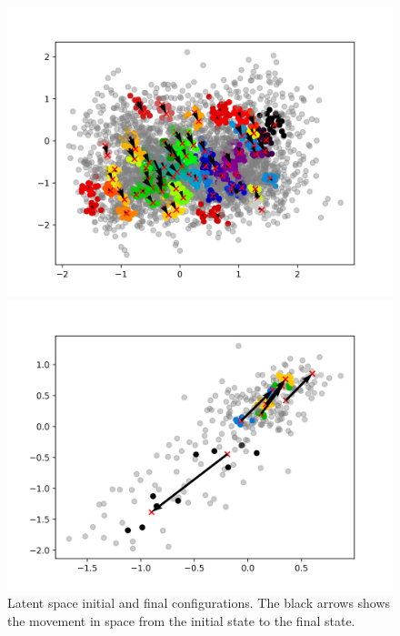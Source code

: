 \documentclass[mscthesis]{usiinfthesis}
\begin{document}
\begin{figure}[H] 
  \begin{minipage}[b]{0.5\linewidth}
    \centering
    \includegraphics[width=\textwidth]{latentspace_cluster_species.png}
    \vspace{4ex}
  \end{minipage}%
  \begin{minipage}[b]{0.5\linewidth}
    \centering
    \includegraphics[width=\textwidth]{latentspace_cluster_region.png}
    \vspace{4ex}
  \end{minipage}  
\caption{Latent space initial and final configurations. The black arrows shows the movement in space from the initial state to the final state.}
\label{fig:latentspace_cluster}
\end{figure}
\end{document}
